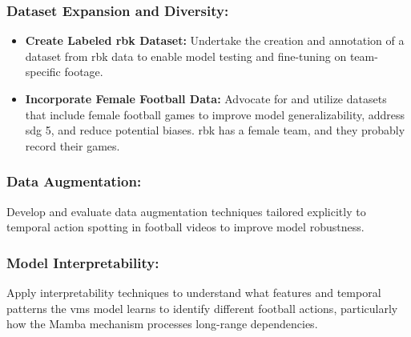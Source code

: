 \subsubsection{Dataset Expansion and Diversity:}
    \begin{itemize}
        \item \textbf{Create Labeled \acrfull{rbk} Dataset:} Undertake the creation and annotation of a dataset from \acrshort{rbk} data to enable model testing and fine-tuning on team-specific footage.
        \item \textbf{Incorporate Female Football Data:} Advocate for and utilize datasets that include female football games to improve model generalizability, address \acrshort{sdg} 5, and reduce potential biases. \acrshort{rbk} has a female team, and they probably record their games. 
    \end{itemize}
    
\subsubsection{Data Augmentation:} Develop and evaluate data augmentation techniques tailored explicitly to temporal action spotting in football videos to improve model robustness.

\subsubsection{Model Interpretability:} Apply interpretability techniques to understand what features and temporal patterns the \acrshort{vms} model learns to identify different football actions, particularly how the Mamba mechanism processes long-range dependencies.


